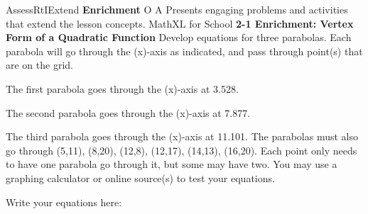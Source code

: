 \documentclass{article}
\newenvironment{te-addendum}[2]{}{}     %
\newcommand{\answer}[1]{}               %
\newcommand{\placeholder}[2]{}          %
\newcommand{\te}[1]{}                   %
\begin{document}
\begin{te-addendum}{Assess}{RtIExtend}
\textbf{Enrichment} O A
Presents engaging problems and activities that extend the lesson concepts.
MathXL for School
\textbf{2-1 Enrichment: Vertex Form of a Quadratic Function}
Develop equations for three parabolas. Each parabola will go through the (x)-axis as indicated, and pass through point(s) that are on the grid.
\item The first parabola goes through the (x)-axis at 3.528.
\item The second parabola goes through the (x)-axis at 7.877.
\item The third parabola goes through the (x)-axis at 11.101.
The parabolas must also go through (5,11), (8,20), (12,8), (12,17), (14,13), (16,20). Each point only needs to have one parabola go through it, but some may have two. You may use a graphing calculator or online source(s) to test your equations.
\placeholder{graph}{Enrichment graph: three black downward parabolas y=-(x-12)^2+17, y=-(x-16)^2+24, y=-(x-8)^2+20 drawn above first-quadrant x,y axes. Horizontal title Distance in Feet, vertical Height in Feet. Square grid spacing 2; labels 0,4,8,12,16,20,24 on both axes, window x=0 to 26,y=0 to 26. Closed plotted points at (5,11),(8,20),(12,8),(12,17),(14,13),(16,24).}
Write your equations here:
\answer{1. (y=-(x-12)^2+17). 2. (y=-(x-16)^2+24). 3. (y=-(x-8)^2+20).}
\te{Printed text lists (16,20); plotted point and supplied second equation have (16,24). Also supplied equation 3 has left intercept approximately 3.528, equation 1 has 7.877, and equation 2 has 11.101, reversing the stated sequence.}
\end{te-addendum}
\end{document}
